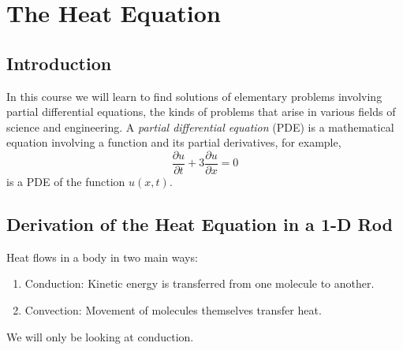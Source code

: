 \documentclass{article}
\begin{document}
\tableofcontents


	\section{The Heat Equation}
	
	\subsection{Introduction}
	
	In this course we will learn to find solutions of elementary problems involving partial differential equations, the kinds of problems that arise in various fields of science and engineering. A \textit{partial differential equation} (PDE) is a mathematical equation involving a function and its partial derivatives, for example,
	\[
		\frac{\partial u}{\partial t} + 3\frac{\partial u}{\partial x} = 0
	\]
	is a PDE of the function $ u(x,t) $.
	
	\subsection{Derivation of the Heat Equation in a 1-D Rod}
	
	Heat flows in a body in two main ways:
	\begin{enumerate}[label=(\arabic*)]
		\item Conduction: Kinetic energy is transferred from one molecule to another.
		\item Convection: Movement of molecules themselves transfer heat.
	\end{enumerate}
	
	We will only be looking at conduction.

	\begin{center}
	\end{center}
	
\end{document}
